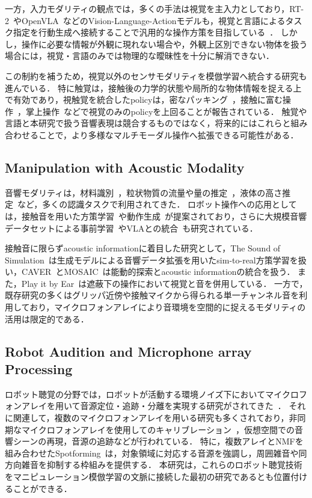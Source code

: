 \documentclass{article}
\begin{document}
一方，入力モダリティの観点では，多くの手法は視覚を主入力としており，RT-2~\citep{brohan2023rt2}やOpenVLA~\citep{kim2024openvla}などのVision-Language-Actionモデルも，視覚と言語によるタスク指定を行動生成へ接続することで汎用的な操作方策を目指している~\citep{vla_survey2025}．
しかし，操作に必要な情報が外観に現れない場合や，外観上区別できない物体を扱う場合には，視覚・言語のみでは物理的な曖昧性を十分に解消できない．

この制約を補うため，視覚以外のセンサモダリティを模倣学習へ統合する研究も進んでいる．
特に触覚は，接触後の力学的状態や局所的な物体情報を捉える上で有効であり，視触覚を統合したpolicyは，密なパッキング~\citep{seehearfeel}，接触に富む操作~\citep{vtt2022,sts_il2024,vitamin2024,tacthru2025}，掌上操作~\citep{neuralfeels2024}などで視覚のみのpolicyを上回ることが報告されている．
触覚や言語と本研究で扱う音響表現は競合するものではなく，将来的にはこれらと組み合わせることで，より多様なマルチモーダル操作へ拡張できる可能性がある．

\subsection{Manipulation with Acoustic Modality}
音響モダリティは，材料識別~\citep{eppe2018interactive,jin2019openenv}，粒状物質の流量や量の推定~\citep{clarke2018learning,wilson2019pouring}，液体の高さ推定~\citep{liang2020audiopouring,du2021robotpouring}など，多くの認識タスクで利用されてきた．
ロボット操作への応用としては，接触音を用いた方策学習~\citep{seehearfeel,maniwav}や動作生成~\citep{thatsoundsright}が提案されており，さらに大規模音響データセットによる事前学習~\citep{hearingtouch2024}やVLAとの統合~\citep{audiovla}も研究されている．

接触音に限らずacoustic informationに着目した研究として，The Sound of Simulation~\citep{multigen2025}は生成モデルによる音響データ拡張を用いたsim-to-real方策学習を扱い，CAVER~\citep{caver2025}とMOSAIC~\citep{mosaic2024}は能動的探索とacoustic informationの統合を扱う．
また，Play it by Ear~\citep{playitbyear}は遮蔽下の操作において視覚と音を併用している．
一方で，既存研究の多くはグリッパ近傍や接触マイクから得られる単一チャンネル音を利用しており，マイクロフォンアレイにより音環境を空間的に捉えるモダリティの活用は限定的である．


\subsection{Robot Audition and Microphone array Processing}
ロボット聴覚の分野では，ロボットが活動する環境ノイズ下においてマイクロフォンアレイを用いて音源定位・追跡・分離を実現する研究がされてきた~\citep{nakadai2020robotaudition,robotaudition_review2025}．
それに関連して，複数のマイクロフォンアレイを用いる研究も多くされており，非同期なマイクロフォンアレイを使用してのキャリブレーション~\citep{wang2024slamcalib}，仮想空間での音響シーンの再現\cite{gabriel20192d}，音源の追跡\citep{yamada2020sound}などが行われている．
特に，複数アレイとNMFを組み合わせたSpotforming~\citep{spotforming_nmf}は，対象領域に対応する音源を強調し，周囲雑音や同方向雑音を抑制する枠組みを提供する．
本研究は，これらのロボット聴覚技術をマニピュレーション模倣学習の文脈に接続した最初の研究であるとも位置付けることができる．
\end{document}
